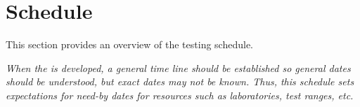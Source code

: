 
\chapter{Schedule}
\label{loc:Schedule}

This section provides an overview of the testing schedule.

{\em When the \STP is developed, a general time line should be established so general dates should be understood, but exact dates may not be known.
Thus, this schedule sets expectations for need-by dates for resources such as laboratories, test ranges, etc.}